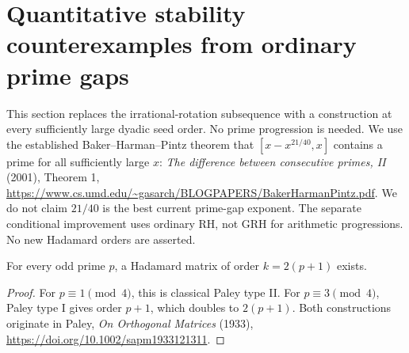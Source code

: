 \section{Quantitative stability counterexamples from ordinary prime gaps}
\label{sec:stability-prime-gaps}
This section replaces the irrational-rotation subsequence with a construction
at every sufficiently large dyadic seed order. No prime progression is
needed. We use the established Baker--Harman--Pintz theorem that
$[x-x^{21/40},x]$ contains a prime for all sufficiently large $x$:
\emph{The difference between consecutive primes, II} (2001), Theorem 1,
\url{https://www.cs.umd.edu/~gasarch/BLOGPAPERS/BakerHarmanPintz.pdf}.
We do not claim $21/40$ is the best current prime-gap exponent.
The separate conditional improvement uses ordinary RH, not GRH for
arithmetic progressions. No new Hadamard orders are asserted.

\begin{lemma}
\label{lem:stability-any-prime}
For every odd prime $p$, a Hadamard matrix of order $k=2(p+1)$ exists.
\end{lemma}
\begin{proof}
For $p\equiv1\pmod4$, this is classical Paley type II. For
$p\equiv3\pmod4$, Paley type I gives order $p+1$, which doubles to
$2(p+1)$. Both constructions originate in Paley,
\emph{On Orthogonal Matrices} (1933),
\url{https://doi.org/10.1002/sapm1933121311}.
\end{proof}

